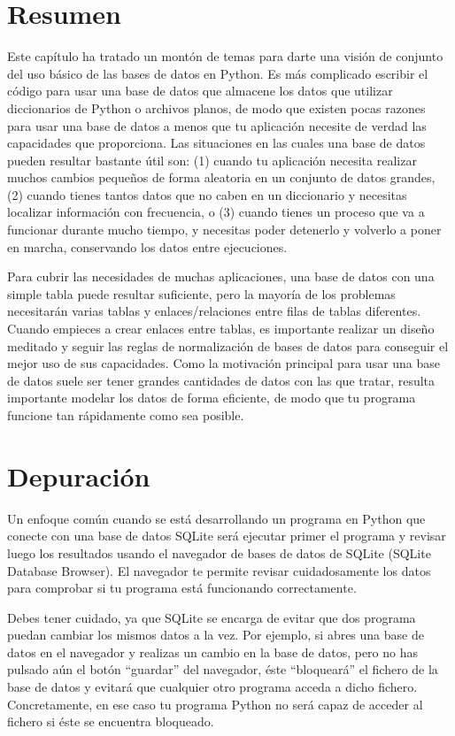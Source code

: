 \section{Resumen}

Este capítulo ha tratado un montón de temas para darte una visión de conjunto del uso básico
de las bases de datos en Python. Es más complicado escribir el código para usar una base
de datos que almacene los datos que utilizar diccionarios de Python o archivos planos, de modo que
existen pocas razones para usar una base de datos a menos que tu aplicación necesite de verdad
las capacidades que proporciona. Las situaciones en las cuales una base de datos pueden resultar
bastante útil son:
(1) cuando tu aplicación necesita realizar muchos cambios pequeños de forma aleatoria en un conjunto
de datos grandes,
(2) cuando tienes tantos datos que no caben en un diccionario y necesitas localizar
información con frecuencia, o
(3) cuando tienes un proceso que va a funcionar durante mucho tiempo, y necesitas poder
detenerlo y volverlo a poner en marcha, conservando los datos entre ejecuciones.

Para cubrir las necesidades de muchas aplicaciones, una base de datos con una simple tabla puede
resultar suficiente, pero la mayoría de los problemas necesitarán varias tablas y enlaces/relaciones
entre filas de tablas diferentes. Cuando empieces a crear enlaces entre tablas,
es importante realizar un diseño meditado y seguir las
reglas de normalización de bases de datos para conseguir el mejor uso de sus capacidades.
Como la motivación principal para usar una base de datos
suele ser tener grandes cantidades de datos con las que tratar, resulta importante
modelar los datos de forma eficiente, de modo que tu programa funcione tan rápidamente como sea
posible. 

\section{Depuración}

Un enfoque común cuando se está desarrollando un programa en Python que conecte con
una base de datos SQLite será ejecutar primer el programa y revisar luego los
resultados usando el navegador de bases de datos de SQLite (SQLite Database Browser). El navegador
te permite revisar cuidadosamente los datos para comprobar si tu programa está funcionando
correctamente.

Debes tener cuidado, ya que SQLite se encarga de evitar que dos programa puedan
cambiar los mismos datos a la vez. Por ejemplo, si abres
una base de datos en el navegador y realizas un cambio en la base de datos,
pero no has pulsado aún el botón ``guardar'' del navegador, éste
``bloqueará'' el fichero de la base de datos y evitará que cualquier otro programa
acceda a dicho fichero. Concretamente, en ese caso tu programa Python
no será capaz de acceder al fichero si éste se encuentra bloqueado.

